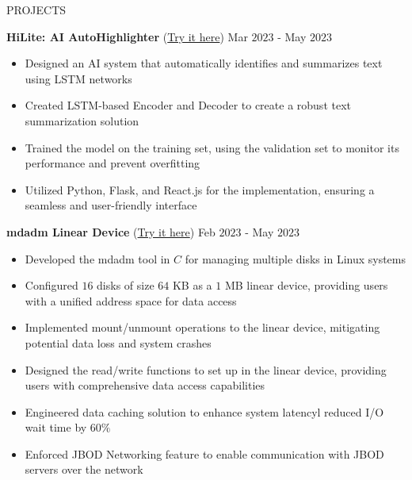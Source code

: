 \documentclass{resume} %
\begin{document}
\begin{rSection}{PROJECTS}

\textbf{ HiLite: AI AutoHighlighter }{(\href{https://github.com/harshitjain17/HiLite-AIAutoHighlighter}{Try it here})} \hfill Mar $2023$ - May $2023$
\begin{itemize}[itemsep = -4pt]
    \item Designed an AI system that automatically identifies and summarizes text using LSTM networks
    \item Created LSTM-based Encoder and Decoder to create a robust text summarization solution
    \item Trained the model on the training set, using the validation set to monitor its performance and prevent overfitting
    \item Utilized Python, Flask, and React.js for the implementation, ensuring a seamless and user-friendly interface
\end{itemize}

\textbf{ mdadm Linear Device }{(\href{https://github.com/harshitjain17/mdadm-Linear-Device}{Try it here})} \hfill Feb $2023$ - May $2023$
\begin{itemize}[itemsep = -4pt]
    \item Developed the mdadm tool in $C$ for managing multiple disks in Linux systems
    \item Configured $16$ disks of size $64$ KB as a $1$ MB linear device, providing users with a unified address space for data access
    \item Implemented mount/unmount operations to the linear device, mitigating potential data loss and system crashes
    \item Designed the read/write functions to set up in the linear device, providing users with comprehensive data access capabilities
    \item Engineered data caching solution to enhance system latencyl reduced I/O wait time by $60\%$
    \item Enforced JBOD Networking feature to enable communication with JBOD servers over the network
\end{itemize}


\end{rSection}
\end{document}
